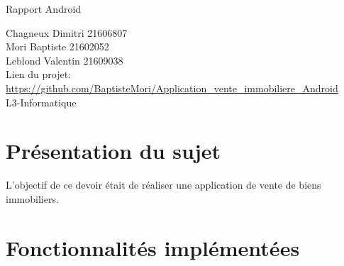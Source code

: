 \documentclass[a4paper,12pt]{article} %
\begin{document}


\begin{titlepage}

\vspace{7cm}

\begin{center}

\begin{Huge}
Rapport Android\\
\end{Huge}
\vspace{2cm}
\begin{large}
Chagneux Dimitri 21606807\\
Mori Baptiste 21602052\\
Leblond Valentin 21609038\\
\vspace{1cm}
Lien du projet:\\
\url{https://github.com/BaptisteMori/Application_vente_immobiliere_Android}\\
\vspace{1cm}
L3-Informatique
\end{large}

\end{center}
\end{titlepage}



\newpage

\tableofcontents

\newpage



\section{Présentation du sujet}

L'objectif de ce devoir était de réaliser une application de vente de biens immobiliers.

\section{Fonctionnalités implémentées}
\end{document}
